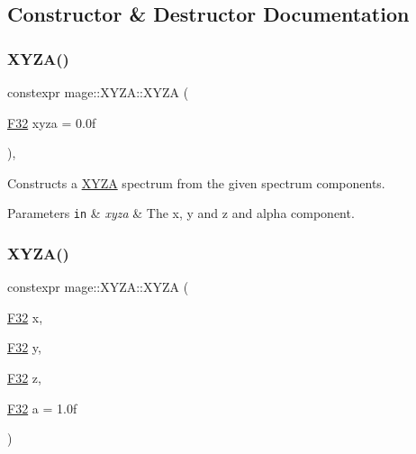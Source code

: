 \subsection{Constructor \& Destructor Documentation}
\mbox{\label{structmage_1_1_x_y_z_a_ab954075ab032465c9199870646a2718b}} 
\subsubsection{\texorpdfstring{X\+Y\+Z\+A()}{XYZA()}\hspace{0.1cm}{\footnotesize\ttfamily [1/7]}}
{\footnotesize\ttfamily constexpr mage\+::\+X\+Y\+Z\+A\+::\+X\+Y\+ZA (\begin{DoxyParamCaption}\item[{\mbox{\hyperlink{namespacemage_aa97e833b45f06d60a0a9c4fc22ae02c0}{F32}}}]{xyza = {\ttfamily 0.0f} }\end{DoxyParamCaption})\hspace{0.3cm}{\ttfamily [explicit]}, {\ttfamily [noexcept]}}

Constructs a \mbox{\hyperlink{structmage_1_1_x_y_z_a}{X\+Y\+ZA}} spectrum from the given spectrum components.


\begin{DoxyParams}[1]{Parameters}
\mbox{\tt in}  & {\em xyza} & The x, y and z and alpha component. \\
\hline
\end{DoxyParams}
\mbox{\label{structmage_1_1_x_y_z_a_abe082fe71a6b7f7a855b65f5491e24d6}} 
\subsubsection{\texorpdfstring{X\+Y\+Z\+A()}{XYZA()}\hspace{0.1cm}{\footnotesize\ttfamily [2/7]}}
{\footnotesize\ttfamily constexpr mage\+::\+X\+Y\+Z\+A\+::\+X\+Y\+ZA (\begin{DoxyParamCaption}\item[{\mbox{\hyperlink{namespacemage_aa97e833b45f06d60a0a9c4fc22ae02c0}{F32}}}]{x,  }\item[{\mbox{\hyperlink{namespacemage_aa97e833b45f06d60a0a9c4fc22ae02c0}{F32}}}]{y,  }\item[{\mbox{\hyperlink{namespacemage_aa97e833b45f06d60a0a9c4fc22ae02c0}{F32}}}]{z,  }\item[{\mbox{\hyperlink{namespacemage_aa97e833b45f06d60a0a9c4fc22ae02c0}{F32}}}]{a = {\ttfamily 1.0f} }\end{DoxyParamCaption})\hspace{0.3cm}{\ttfamily [noexcept]}}


